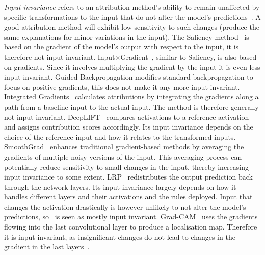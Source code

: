 \emph{Input invariance} refers to an attribution method's ability to remain unaffected by specific transformations to the input that do not alter the model's predictions~\cite{YehHSIR19}. A good attribution method will exhibit low sensitivity to such changes (\ie produce the same explanations for minor variations in the input). The Saliency method~\cite{SimonyanVZ13} is based on the gradient of the model’s output with respect to the input, it is therefore not input invariant. Input$\times$Gradient~\cite{SimonyanVZ13}, similar to Saliency, is also based on gradients. Since it involves multiplying the gradient by the input it is even less input invariant. Guided Backpropagation modifies standard backpropagation to focus on positive gradients, this does not make it any more input invariant. Integrated Gradients~\cite{SundararajanTY17} calculates attributions by integrating the gradients along a path from a baseline input to the actual input. The method is therefore generally not input invariant. DeepLIFT~\cite{ShrikumarGK17} compares activations to a reference activation and assigns contribution scores accordingly. Its input invariance depends on the choice of the reference input and how it relates to the transformed inputs. SmoothGrad~\cite{SmilkovTKVW17} enhances traditional gradient-based methods by averaging the gradients of multiple noisy versions of the input. This averaging process can potentially reduce sensitivity to small changes in the input, thereby increasing input invariance to some extent. LRP~\cite{bach2015pixel} redistributes the output prediction back through the network layers. Its input invariance largely depends on how it handles different layers and their activations and the rules deployed. Input that changes the activation drastically is however unlikely to not alter the model's predictions, so \LRP\ is seen as mostly input invariant. Grad-CAM~\cite{SelvarajuCDVPB20} uses the gradients flowing into the last convolutional layer to produce a localisation map. Therefore it is input invariant, as insignificant changes do not lead to changes in the gradient in the last layers~\cite{AdebayoGMGHK18}.



